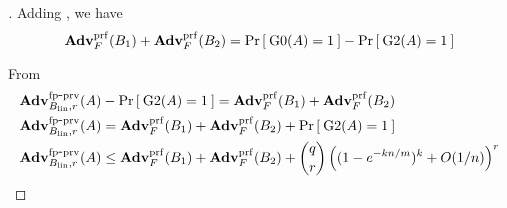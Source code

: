 \begin{proof}[]
\noindent
Adding , we have
\begin{equation}
\AdvPRF{F}{B_1} +\AdvPRF{F}{B_2} = \Prob{\game{0}(A)=1} - \Prob{\game{2}(A)=1}\label{eq:13}
\end{equation}

From  \\
\begin{align}
\nonumber \AdvFPSecHash{B_{\mathrm{lin}},r}{A} &- \Prob{\game{2}(A)=1} =  \AdvPRF{F}{B_1} + \AdvPRF{F}{B_2}   \\
\nonumber \AdvFPSecHash{B_{\mathrm{lin}},r}{A}  &=  \AdvPRF{F}{B_1} + \AdvPRF{F}{B_2} + \Prob{\game{2}(A)=1}  \\
\AdvFPSecHash{B_{\mathrm{lin}},r}{A} &\leq  \AdvPRF{F}{B_1} +
\AdvPRF{F}{B_2}  +{\dbinom{q}{r}} \left( (1-e^{-kn/m})^k + O(1/n) \right)^r
\end{align}


\end{proof}
